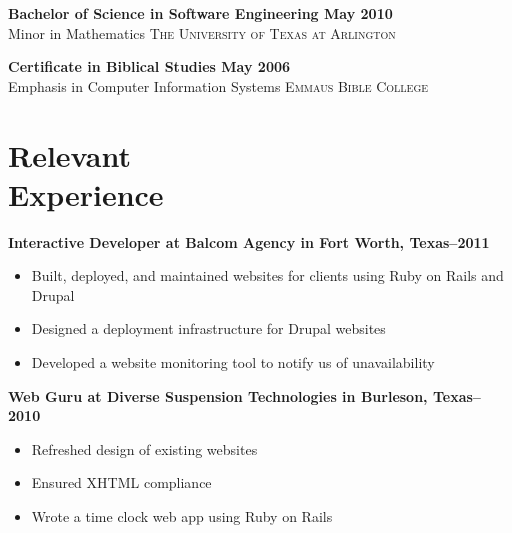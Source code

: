 \documentclass[margin]{res}
\newcommand{\sectionspace}{\vspace{10pt}}
\begin{document}
\begin{resume}
                \textbf{Bachelor of Science in Software Engineering \dotfill May 2010 }  \\
                Minor in Mathematics \hfill  \textsc{The University of Texas at Arlington}
              
                \textbf{Certificate in Biblical Studies \dotfill May 2006 }  \\
                Emphasis in Computer Information Systems \hfill  \textsc{Emmaus Bible College}
              
\sectionspace


\section{
  Relevant \\ Experience
}

              
                \textbf{Interactive Developer
                 at Balcom Agency in Fort Worth, Texas--2011}
                 \vspace{-10pt}\begin{itemize} \itemsep -2pt %
                   \item Built, deployed, and maintained websites for clients using Ruby on Rails and Drupal
                 
                   \item Designed a deployment infrastructure for Drupal websites
                 
                   \item Developed a website monitoring tool to notify us of unavailability
                 \end{itemize}
              
                \textbf{Web Guru
                 at Diverse Suspension Technologies in Burleson, Texas--2010}
                 \vspace{-10pt}\begin{itemize} \itemsep -2pt %
                   \item Refreshed design of existing websites
                 
                   \item Ensured XHTML compliance
                 
                   \item Wrote a time clock web app using Ruby on Rails
                 \end{itemize}
              

\end{resume}
\end{document}
